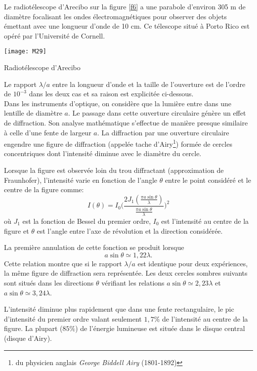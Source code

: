\noindent Le radiotélescope d'Arecibo sur la figure \ref{f6} a une parabole d'environ 305 m de diamètre focalisant les ondes électromagnétiques pour observer des objets émettant avec une longueur d'onde de 10 cm. Ce télescope situé à Porto Rico est opéré par l'Université de Cornell.

\begin{marginfigure}[-2cm]
\texttt{[image: M29]}
\caption{Radiotélescope d'Arecibo}
\label{f6}
\end{marginfigure}

\noindent Le rapport $\lambda/a$ entre la longueur d'onde et la taille de l'ouverture est de l'ordre de $10^{-3}$ dans les deux cas et sa raison est explicitée ci-dessous.\\

\noindent Dans les instruments d'optique, on considère que la lumière entre dans une lentille de diamètre $a$. Le passage dans cette ouverture circulaire génère un effet de diffraction. Son analyse mathématique s'effectue de manière presque similaire à celle d'une fente de largeur $a$. La diffraction par une ouverture circulaire engendre une figure de diffraction (appelée tache d'Airy\footnote{du physicien anglais \textit{George Biddell Airy} (1801-1892)}) formée de cercles concentriques dont l'intensité diminue avec le diamètre du cercle. 

\noindent Lorsque la figure est observée loin du trou diffractant (approximation de Fraunhofer), l'intensité varie en fonction de l'angle $\theta$ entre le point considéré et le centre de la figure comme:
$$
    I(\theta)=I_0\bigg(\frac{2J_1(\frac{\pi a\sin\theta}{\lambda})}{\frac{\pi a\sin\theta}{\lambda}}\bigg)^2
$$
où $J_1$ est la fonction de Bessel du premier ordre, $I_0$ est l'intensité au centre de la figure et $\theta$ est l'angle entre l'axe de révolution et la direction considérée.

\noindent La première annulation de cette fonction se produit lorsque 
$$
    a\sin\theta\simeq1,22\lambda.
$$
Cette relation montre que si le rapport $\lambda/a$ est identique pour deux expériences, la même figure de diffraction sera représentée. Les deux cercles sombres suivants sont situés dans les directions $\theta$ vérifiant les relations $a\sin\theta\simeq2,23\lambda$ et $a\sin\theta\simeq3,24\lambda$.

\noindent L'intensité diminue plus rapidement que dans une fente rectangulaire, le pic d'intensité du premier ordre valant seulement $1,7\%$ de l'intensité au centre de la figure. La plupart ($85\%$) de l'énergie lumineuse est située dans le disque central (disque d'Airy).\\

